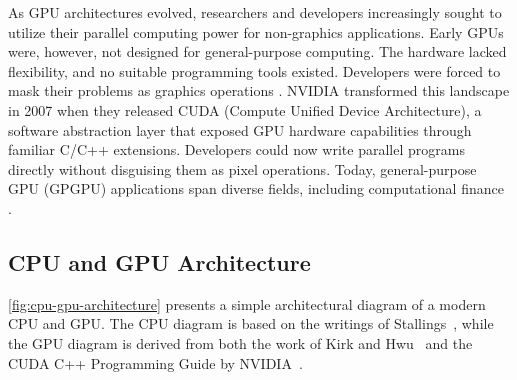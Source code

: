 \documentclass[english,12pt,a4paper,pdftex,sci,utf8]{aaltothesis}
\begin{document}
As GPU architectures evolved, researchers and developers increasingly sought to utilize their parallel computing power for non-graphics applications. Early GPUs were, however, not designed for general-purpose computing. The hardware lacked flexibility, and no suitable programming tools existed. Developers were forced to mask their problems as graphics operations \cite{sanders2010cuda, kirk2016programming}. NVIDIA transformed this landscape in 2007 when they released CUDA (Compute Unified Device Architecture), a software abstraction layer that exposed GPU hardware capabilities through familiar C/C++ extensions. Developers could now write parallel programs directly without disguising them as pixel operations. Today, general-purpose GPU (GPGPU) applications span diverse fields, including computational finance \cite{sanders2010cuda, kirk2016programming}.

\subsection{CPU and GPU Architecture}
 \cref{fig:cpu-gpu-architecture} presents a simple architectural diagram of a modern CPU and GPU. The CPU diagram is based on the writings of Stallings~\cite{stallings2011operating}, while the GPU diagram is derived from both the work of Kirk and Hwu~\cite{kirk2016programming} and the CUDA C++ Programming Guide by NVIDIA~\cite{cuda2025guide}.
\end{document}
